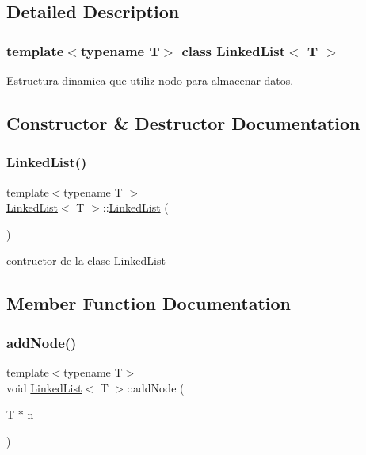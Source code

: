 \subsection{Detailed Description}
\subsubsection*{template$<$typename T$>$\newline
class Linked\+List$<$ T $>$}

Estructura dinamica que utiliz nodo para almacenar datos. 

\subsection{Constructor \& Destructor Documentation}
\mbox{\label{class_linked_list_a3c20fcfec867e867f541061a09fc640c}} 
\subsubsection{\texorpdfstring{Linked\+List()}{LinkedList()}}
{\footnotesize\ttfamily template$<$typename T $>$ \\
\hyperlink{class_linked_list}{Linked\+List}$<$ T $>$\+::\hyperlink{class_linked_list}{Linked\+List} (\begin{DoxyParamCaption}{ }\end{DoxyParamCaption})}



contructor de la clase \hyperlink{class_linked_list}{Linked\+List} 



\subsection{Member Function Documentation}
\mbox{\label{class_linked_list_ad4624e0abf07930148dbc6d01fa72e46}} 
\subsubsection{\texorpdfstring{add\+Node()}{addNode()}}
{\footnotesize\ttfamily template$<$typename T$>$ \\
void \hyperlink{class_linked_list}{Linked\+List}$<$ T $>$\+::add\+Node (\begin{DoxyParamCaption}\item[{T $\ast$}]{n }\end{DoxyParamCaption})}



